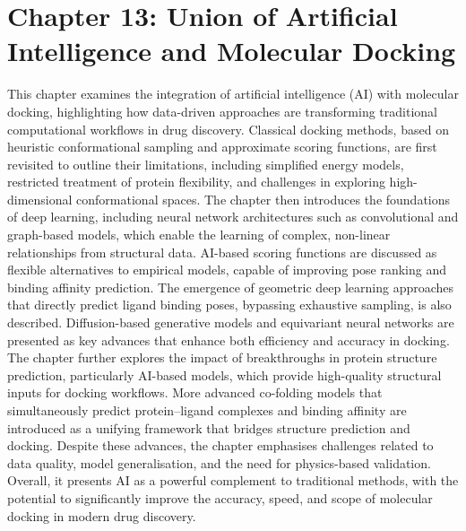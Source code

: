 \documentclass[12pt,a4paper]{article}
\begin{document}
\section*{Chapter 13: Union of Artificial Intelligence and Molecular Docking}
This chapter examines the integration of artificial intelligence (AI) with molecular docking, highlighting how data-driven approaches are transforming traditional computational workflows in drug discovery. Classical docking methods, based on heuristic conformational sampling and approximate scoring functions, are first revisited to outline their limitations, including simplified energy models, restricted treatment of protein flexibility, and challenges in exploring high-dimensional conformational spaces. The chapter then introduces the foundations of deep learning, including neural network architectures such as convolutional and graph-based models, which enable the learning of complex, non-linear relationships from structural data. AI-based scoring functions are discussed as flexible alternatives to empirical models, capable of improving pose ranking and binding affinity prediction. The emergence of geometric deep learning approaches that directly predict ligand binding poses, bypassing exhaustive sampling, is also described. Diffusion-based generative models and equivariant neural networks are presented as key advances that enhance both efficiency and accuracy in docking. The chapter further explores the impact of breakthroughs in protein structure prediction, particularly AI-based models, which provide high-quality structural inputs for docking workflows. More advanced co-folding models that simultaneously predict protein–ligand complexes and binding affinity are introduced as a unifying framework that bridges structure prediction and docking. Despite these advances, the chapter emphasises challenges related to data quality, model generalisation, and the need for physics-based validation. Overall, it presents AI as a powerful complement to traditional methods, with the potential to significantly improve the accuracy, speed, and scope of molecular docking in modern drug discovery.
\end{document}
